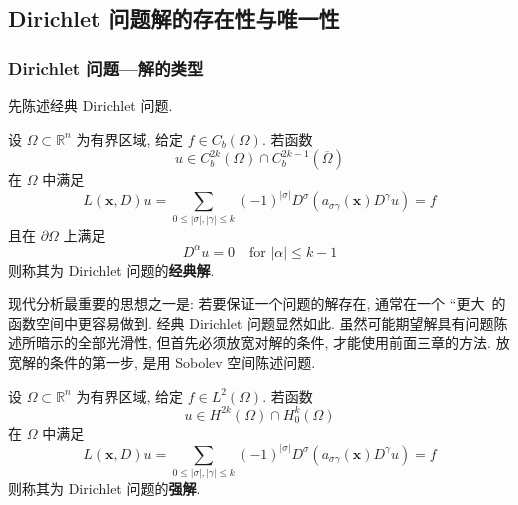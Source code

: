 \subsection{Dirichlet 问题解的存在性与唯一性}\label{sec:dirichlet-existence-and-uniqueness}

\subsubsection{Dirichlet 问题---解的类型}\label{subsec:dirichlet-types-of-solutions}

先陈述经典 Dirichlet 问题.

\begin{Definition}
\label{def:classical-dirichlet-solution}
设 $\Omega\subset\mathbb{R}^n$ 为有界区域, 给定 $f\in C_b(\Omega)$. 若函数\[u\in C_b^{2k}(\Omega)\cap C_b^{2k-1}(\overline\Omega)\]在 $\Omega$ 中满足
\begin{equation}\label{eq:classical-dirichlet-divergence-equation}
L(\bm{x},D)u=\sum_{0\leq|\sigma|,|\gamma|\leq k}(-1)^{|\sigma|}D^\sigma(a_{\sigma\gamma}(\bm{x})D^\gamma u)=f
\end{equation}
且在 $\partial\Omega$ 上满足
\begin{equation}\label{eq:classical-dirichlet-homogeneous-boundary-conditions}
D^\alpha u=0\quad\text{for }|\alpha|\leq k-1
\end{equation}
则称其为 Dirichlet 问题的\textbf{经典解}.
\end{Definition}

现代分析最重要的思想之一是: 若要保证一个问题的解存在, 通常在一个 ``更大\textquotesingle\textquotesingle\ 的函数空间中更容易做到. 经典 Dirichlet 问题显然如此. 虽然可能期望解具有问题陈述所暗示的全部光滑性, 但首先必须放宽对解的条件, 才能使用前面三章的方法. 放宽解的条件的第一步, 是用 Sobolev 空间陈述问题.

\begin{Definition}
\label{def:strong-dirichlet-solution}
设 $\Omega\subset\mathbb{R}^n$ 为有界区域, 给定 $f\in L^2(\Omega)$. 若函数\[u\in H^{2k}(\Omega)\cap H_0^k(\Omega)\]在 $\Omega$ 中满足
\begin{equation}\label{eq:strong-dirichlet-divergence-equation}
L(\bm{x},D)u=\sum_{0\leq|\sigma|,|\gamma|\leq k}(-1)^{|\sigma|}D^\sigma(a_{\sigma\gamma}(\bm{x})D^\gamma u)=f
\end{equation}
则称其为 Dirichlet 问题的\textbf{强解}.
\end{Definition}


